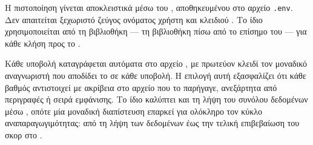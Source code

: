 Η πιστοποίηση γίνεται αποκλειστικά μέσω του  \texttt{}, αποθηκευμένου στο αρχείο \texttt{.env}.
Δεν απαιτείται ξεχωριστό ζεύγος ονόματος χρήστη και κλειδιού .
Το ίδιο  χρησιμοποιείται από τη βιβλιοθήκη \texttt{} --- τη βιβλιοθήκη πίσω από το επίσημο  του  --- για κάθε κλήση προς το .

Κάθε υποβολή καταγράφεται αυτόματα στο αρχείο \texttt{}, με πρωτεύον κλειδί τον μοναδικό αναγνωριστή \texttt{} που αποδίδει το  σε κάθε υποβολή.
Η επιλογή αυτή εξασφαλίζει ότι κάθε βαθμός αντιστοιχεί με ακρίβεια στο αρχείο που το παρήγαγε, ανεξάρτητα από περιγραφές ή σειρά εμφάνισης.
Το ίδιο  καλύπτει και τη λήψη του συνόλου δεδομένων μέσω \texttt{}, οπότε μία μοναδική διαπίστευση επαρκεί για ολόκληρο τον κύκλο αναπαραγωγιμότητας: από τη λήψη των δεδομένων έως την τελική επιβεβαίωση του σκορ στο .
